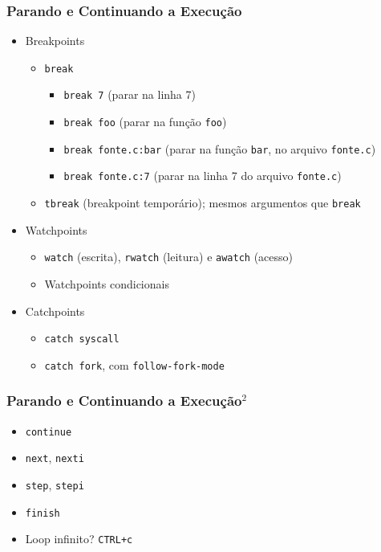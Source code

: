 \documentclass[xcolor=pdftex,dvipsnames,table,t]{beamer}
\begin{document}
\begin{frame}[fragile]
	\frametitle{Parando e Continuando a Execução}
	  \begin{itemize}
	    \item{Breakpoints}
	      \begin{itemize}
		\item{\verb|break|}
		  \begin{itemize}
		    \item{\verb|break 7| (parar na linha 7)}
		    \item{\verb|break foo| (parar na função \verb|foo|)}
		    \item{\verb|break fonte.c:bar| (parar na função \verb|bar|, no arquivo \verb|fonte.c|)}
		    \item{\verb|break fonte.c:7| (parar na linha 7 do arquivo \verb|fonte.c|)}
		  \end{itemize}
		\item{\verb|tbreak| (breakpoint temporário); mesmos argumentos que \verb|break|}
	      \end{itemize}
	    \item{Watchpoints}
	      \begin{itemize}
		\item{\verb|watch| (escrita), \verb|rwatch| (leitura) e \verb|awatch| (acesso)}
		\item{Watchpoints condicionais}
	      \end{itemize}
	    \item{Catchpoints}
	      \begin{itemize}
		\item{\verb|catch syscall|}
		\item{\verb|catch fork|, com \verb|follow-fork-mode|}
	      \end{itemize}
	  \end{itemize}
\end{frame}

\begin{frame}[fragile]
	\frametitle{Parando e Continuando a Execução$^2$}
	  \begin{itemize}
	    \item{\verb|continue|}
	    \item{\verb|next|, \verb|nexti|}
	    \item{\verb|step|, \verb|stepi|}
	    \item{\verb|finish|}
	    \item{Loop infinito? \verb|CTRL+c|}
	  \end{itemize}
\end{frame}
\end{document}
